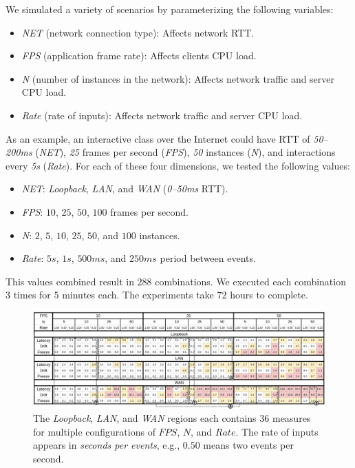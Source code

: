 \documentclass[sigplan,screen]{acmart}
\begin{document}
We simulated a variety of scenarios by parameterizing the following variables:
%
\begin{itemize}
\item \emph{NET} (network connection type):
    Affects network RTT.
\item \emph{FPS} (application frame rate):
    Affects clients CPU load.
\item \emph{N} (number of instances in the network):
    Affects network traffic and server CPU load.
\item \emph{Rate} (rate of inputs):
    Affects network traffic and server CPU load.
\end{itemize}
%

As an example, an interactive class over the Internet could have
    RTT of \emph{50--200ms} (\emph{NET}),
    \emph{25} frames per second (\emph{FPS}),
    \emph{50} instances (\emph{N}),
    and interactions every \emph{5s} (\emph{Rate}).
%
For each of these four dimensions, we tested the following values:
%
\begin{itemize}
\item \emph{NET}: \emph{Loopback}, \emph{LAN}, and \emph{WAN} (\emph{0--50ms} RTT).
\item \emph{FPS}: $10$, $25$, $50$, $100$ frames per second.     %
\item \emph{N}: $2$, $5$, $10$, $25$, $50$, and $100$ instances. %
\item \emph{Rate}: $5s$, $1s$, $500ms$, and $250ms$ period between events.
\end{itemize}                                                    %
%
This values combined result in $288$ combinations.
We executed each combination $3$ times for $5$ minutes each.
The experiments take $72$ hours to complete.

\begin{figure}[t]
  \centering
  \includegraphics[width=\linewidth]{table2}
  \caption{
    \label{fig.table}
    The \emph{Loopback}, \emph{LAN}, and \emph{WAN} regions each contains $36$
    measures for multiple configurations of $FPS$, $N$, and $Rate$.
    The rate of inputs appears in \emph{seconds per events}, e.g., $0.50$ means
    two events per second.
  }
\end{figure}
\end{document}
